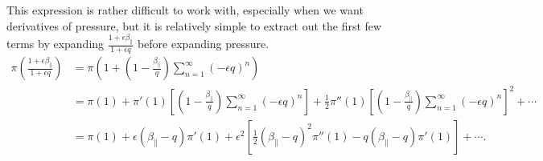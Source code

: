 \documentclass{article}
\newcommand{\para}{\parallel}
\newcommand{\ep}{\epsilon}
\newcommand{\frinv}{\frac{1+\ep\beta_\para}{1+\ep q}}
\newcommand{\pth} [1] {\left( #1 \right) }
\newcommand{\br} [1] {\left[ #1 \right] }
\begin{document}
This expression is rather difficult to work with, especially when we want derivatives of pressure, but it is relatively simple to extract out the first few terms by expanding $\frinv$ before expanding pressure. 
\begin{align*}
    \pi\pth{\frinv} &= \pi\pth{1 + \pth{1 - \frac{\beta_\para}{q}} \sum^\infty_{n=1} \pth{-\ep q}^n} \\ 
    &= \pi(1) + \pi'(1)\br{\pth{1 - \frac{\beta_\para}{q}} \sum^\infty_{n=1} \pth{-\ep q}^n} + \frac{1}{2}\pi''(1) \br{\pth{1 - \frac{\beta_\para}{q}} \sum^\infty_{n=1} \pth{-\ep q}^n}^2 + \cdots \\ 
    &= \pi(1) + \ep\pth{\beta_\para-q}\pi'(1) + \ep^2\br{\frac{1}{2}\pth{\beta_\para-q}^2\pi''(1) -q \pth{\beta_\para-q}\pi'(1)} + \cdots. 
\end{align*}
\end{document}
